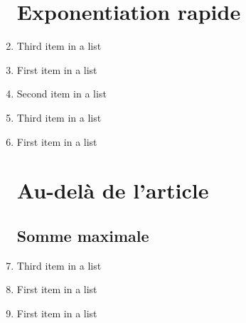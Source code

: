 \documentclass[paper=a4, fontsize=11pt]{scrartcl}
\numberwithin{equation}{section}		%
\numberwithin{figure}{section}			%
\numberwithin{table}{section}				%
\begin{document}
\begin{enumerate}
\section{Exponentiation rapide}

	\item Third item in a list
   	\item First item in a list
	\item Second item in a list
	\item Third item in a list
    \item First item in a list

\section{Au-delà de l’article}
\subsection{Somme maximale}
	\item Third item in a list
   	\item First item in a list
   	\item First item in a list

\end{enumerate}
\end{document}
